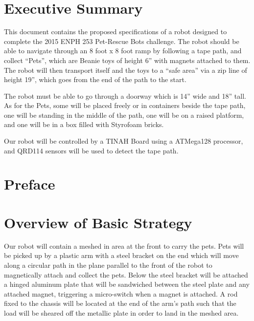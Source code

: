 \documentclass[11pt, oneside]{article} %
\begin{document}
\section*{Executive Summary}
This document contains the proposed specifications of a robot designed to complete the 2015 ENPH 253 Pet-Rescue Bots challenge. The robot should be able to navigate through an 8 foot x 8 foot ramp by following a tape path, and collect “Pets”, which are Beanie toys of height 6” with magnets attached to them. The robot will then transport itself and the toys to a “safe area” via a zip line of height 19”, which goes from the end of the path to the start.

The robot must be able to go through a doorway which is 14” wide and 18” tall. As for the Pets, some will be placed freely or in containers beside the tape path, one will be standing in the middle of the path, one will be on a raised platform, and one will be in a box filled with Styrofoam bricks.

Our robot will be controlled by a TINAH Board using a ATMega128 processor, and QRD114 sensors will be used to detect the tape path.

\newpage


\tableofcontents %
\listoffigures %
\listoftables %


\newpage

\section{Preface}

\section{Overview of Basic Strategy}

Our robot will contain a meshed in area at the front to carry the pets. Pets will be picked up by a plastic arm with a steel bracket on the end which will move along a circular path in the plane parallel to the front of the robot to magnetically attach and collect the pets. Below the steel bracket will be attached a hinged aluminum plate that will be sandwiched between the steel plate and any attached magnet, triggering a micro-switch when a magnet is attached. A rod fixed to the chassis will be located at the end of the arm's path such that the load will be sheared off the metallic plate in order to land in the meshed area.
\end{document}
